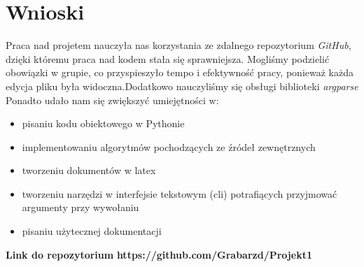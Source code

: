 \documentclass[a4paper,titleauthor]{mwart}
\begin{document}
\section{Wnioski}
Praca nad projetem nauczyła nas korzystania ze zdalnego repozytorium \textit{GitHub}, dzięki któremu praca nad kodem stała się sprawniejsza. Mogliśmy podzielić obowiązki w grupie, co przyspieszyło tempo i efektywność pracy, ponieważ każda edycja pliku była widoczna.Dodatkowo nauczyliśmy się obsługi biblioteki \textit{argparse}
\newline
Ponadto udało nam się zwiększyć umiejętności w:
\begin{itemize}
    \item pisaniu kodu obiektowego w Pythonie
    \item implementowaniu algorytmów pochodzących ze źródeł zewnętrznych
    \item tworzeniu dokumentów w latex
    \item tworzeniu narzędzi w interfejsie tekstowym (cli) potrafiących przyjmować argumenty przy wywołaniu
    \item pisaniu użytecznej dokumentacji
\end{itemize}
\vspace{1cm}

\textbf{\large {Link do repozytorium}}
\newline
\textbf{\large https://github.com/Grabarzd/Projekt1}




\end{document}
